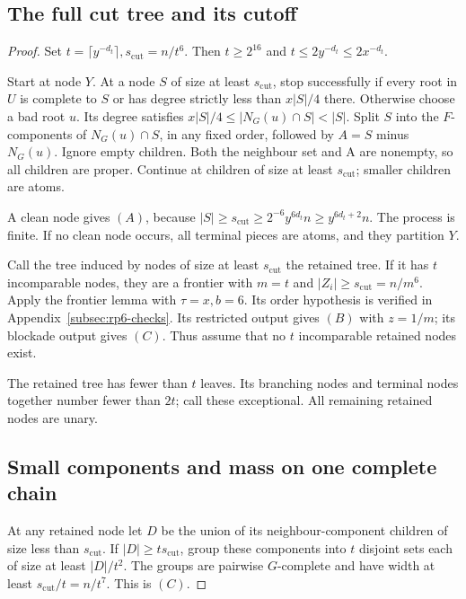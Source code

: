 \documentclass[11pt,a4paper]{article}
\theoremstyle{definition}
\theoremstyle{remark}
\numberwithin{equation}{section}
\begin{document}
\subsection{The full cut tree and its cutoff}\label{subsec:rp6-tree}
\begin{proof}
Set \(t=\lceil y^{-d_{t}}\rceil,\allowbreak  s_{\mathrm{cut}}=n/t^{6}\). Then \(t\ge\allowbreak 2^{16}\) and \(t\le\allowbreak 2y^{-d_{t}}\le\allowbreak 2x^{-d_{t}}\).

Start at node \(Y\). At a node \(S\) of size at least \(s_{\mathrm{cut}}\), stop successfully if every root in \(U\) is complete to \(S\) or has degree strictly less than \(x|S|/4\) there. Otherwise choose a bad root \(u\). Its degree satisfies \(x|S|/4 \le\allowbreak  |N_{G}(u) \cap  S| < |S|\). Split \(S\) into the \(F\)-components of \(N_{G}(u) \cap  S\), in any fixed order, followed by \(A=S\) minus \(N_{G}(u)\). Ignore empty children. Both the neighbour set and A are nonempty, so all children are proper. Continue at children of size at least \(s_{\mathrm{cut}}\); smaller children are atoms.

A clean node gives \((A)\), because \(|S|\ge\allowbreak s_{\mathrm{cut}}\ge\allowbreak 2^{-6} y^{6d_{t}}n\ge\allowbreak y^{6d_{t}+2}n\). The process is finite. If no clean node occurs, all terminal pieces are atoms, and they partition \(Y\).

Call the tree induced by nodes of size at least \(s_{\mathrm{cut}}\) the retained tree. If it has \(t\) incomparable nodes, they are a frontier with \(m=t\) and \(|Z_{i}|\ge\allowbreak s_{\mathrm{cut}}=n/m^{6}\). Apply the frontier lemma with \(\tau=x,\allowbreak b=6\). Its order hypothesis is verified in Appendix~\ref{subsec:rp6-checks}. Its restricted output gives \((B)\) with \(z=1/m\); its blockade output gives \((C)\). Thus assume that no \(t\) incomparable retained nodes exist.


The retained tree has fewer than \(t\) leaves. Its branching nodes and terminal nodes together number fewer than \(2t\); call these exceptional. All remaining retained nodes are unary.
\subsection{Small components and mass on one complete chain}\label{subsec:rp6-mass}
At any retained node let \(D\) be the union of its neighbour-component children of size less than \(s_{\mathrm{cut}}\). If \(|D|\ge\allowbreak ts_{\mathrm{cut}}\), group these components into \(t\) disjoint sets each of size at least \(|D|/t^{2}\). The groups are pairwise \(G\)-complete and have width at least \(s_{\mathrm{cut}}/t=n/t^{7}\). This is \((C)\).


\end{proof}
\end{document}
